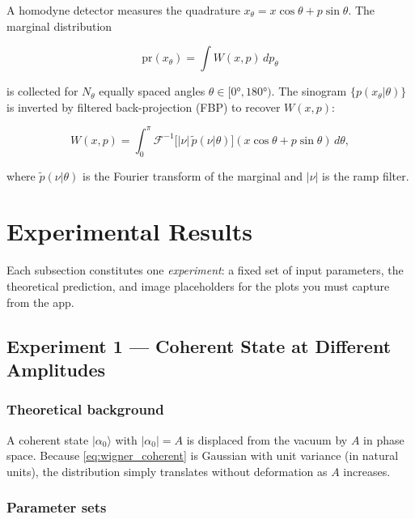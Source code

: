\documentclass[12pt,a4paper]{article}
\begin{document}
A homodyne detector measures the quadrature $x_\theta = x\cos\theta + p\sin\theta$. The marginal distribution

\begin{equation}
  \mathrm{pr}(x_\theta) = \int W(x,p)\,dp_\theta
  \label{eq:marginal}
\end{equation}

is collected for $N_\theta$ equally spaced angles $\theta\in[0°,180°)$. The sinogram $\{p(x_\theta|\theta)\}$ is inverted by filtered back-projection (FBP) to recover $W(x,p)$:

\begin{equation}
  W(x,p) = \int_0^{\pi} \mathcal{F}^{-1}\!\bigl[|\nu|\,\tilde{p}(\nu|\theta)\bigr](x\cos\theta+p\sin\theta)\,d\theta,
  \label{eq:fbp}
\end{equation}

where $\tilde{p}(\nu|\theta)$ is the Fourier transform of the marginal and $|\nu|$ is the ramp filter.

\section{Experimental Results}

Each subsection constitutes one \emph{experiment}: a fixed set of input parameters, the theoretical prediction, and image placeholders for the plots you must capture from the app.

\subsection{Experiment 1 — Coherent State at Different Amplitudes}
\label{sec:exp1}

\subsubsection*{Theoretical background}

A coherent state $|\alpha_0\rangle$ with $|\alpha_0|=A$ is displaced from the vacuum by $A$ in phase space. Because \cref{eq:wigner_coherent} is Gaussian with unit variance (in natural units), the distribution simply translates without deformation as $A$ increases.

\subsubsection*{Parameter sets}
\end{document}
